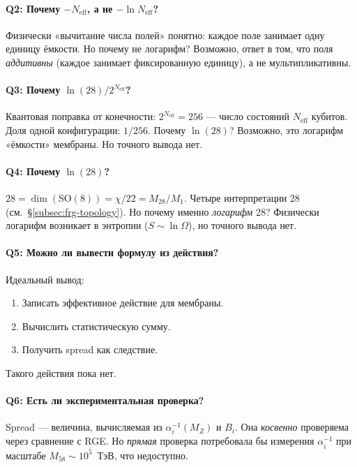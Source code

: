 \documentclass[11pt,a4paper]{article}
\newcommand{\SO}{\ensuremath{\mathrm{SO}}}
\theoremstyle{definition}
\begin{document}
\paragraph{Q2: Почему $- N_{\text{eff}}$, а не $-\ln N_{\text{eff}}$?}
Физически «вычитание числа полей» понятно: каждое поле
занимает одну единицу ёмкости. Но почему не логарифм?
Возможно, ответ в том, что поля \emph{аддитивны} (каждое
занимает фиксированную единицу), а не мультипликативны.

\paragraph{Q3: Почему $\ln(28)/2^{N_{\text{eff}}}$?}
Квантовая поправка от конечности: $2^{N_{\text{eff}}} = 256$
--- число состояний $N_{\text{eff}}$ кубитов. Доля одной
конфигурации: $1/256$. Почему $\ln(28)$? Возможно, это
логарифм «ёмкости» мембраны. Но точного вывода нет.

\paragraph{Q4: Почему \texorpdfstring{$\ln(28)$}{(28)}?}
$28 = \dim(\SO(8)) = \chi/22 = M_{28}/M_1$.
Четыре интерпретации 28 (см.~\S\ref{subsec:frg-topology}).
Но почему именно \emph{логарифм} 28? Физически логарифм
возникает в энтропии ($S \sim \ln \Omega$), но точного
вывода нет.

\paragraph{Q5: Можно ли вывести формулу из действия?}
Идеальный вывод:
\begin{enumerate}
    \item Записать эффективное действие для мембраны.
    \item Вычислить статистическую сумму.
    \item Получить spread как следствие.
\end{enumerate}
Такого действия пока нет.

\paragraph{Q6: Есть ли экспериментальная проверка?}
Spread --- величина, вычисляемая из $\alpha_i^{-1}(M_Z)$
и $B_i$. Она \emph{косвенно} проверяема через сравнение
с RGE. Но \emph{прямая} проверка потребовала бы измерения
$\alpha_i^{-1}$ при масштабе $M_{58} \sim 10^5$~ТэВ,
что недоступно.
\end{document}
